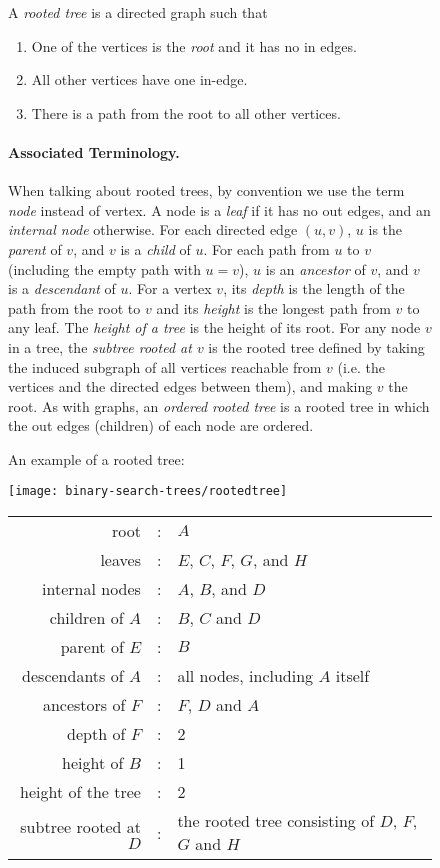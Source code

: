 \begin{figure}
\begin{definition}
\label{def:rootedtree}
A \emph{rooted tree} is a directed graph such that
\begin{enumerate}
\item 
One of the vertices is the \emph{root} and it has no in edges.
\item 
All other vertices have one in-edge.
\item
There is a path from the root to all other vertices.
\end{enumerate}
\paragraph{Associated Terminology.} \rm
When talking about rooted trees, by convention we use the term
\emph{node} instead of vertex.  A node is a \emph{leaf} if it has no
out edges, and an \emph{internal node} otherwise.  For each directed
edge $(u,v)$, $u$ is the \emph{parent} of $v$, and $v$ is a
\emph{child} of $u$.  For each path from $u$ to $v$ (including the
empty path with $u = v$), $u$ is an \emph{ancestor} of $v$, and $v$ is
a \emph{descendant} of $u$.  For a vertex $v$, its \emph{depth} is the
length of the path from the root to $v$ and its \emph{height} is the
longest path from $v$ to any leaf.  The \emph{height of a tree} is the
height of its root.  For any node $v$ in a tree, the \emph{subtree
  rooted at $v$} is the rooted tree defined by taking the induced
subgraph of all vertices reachable from $v$ (i.e. the vertices and the
directed edges between them), and making $v$ the root.  As with
graphs, an \emph{ordered rooted tree} is a rooted tree in which the
out edges (children) of each node are ordered.
\end{definition}

\begin{example}
\label{ex:rootedtree}
An example of a rooted tree:
\begin{center}
  \texttt{[image: binary-search-trees/rootedtree]}
\end{center}
\begin{center}
\begin{tabular}{rcl}
root & : & $A$\\
leaves & : & $E$, $C$, $F$, $G$, and $H$\\
internal nodes & : & $A$, $B$, and $D$\\
children of $A$ & : & $B$, $C$ and $D$\\
parent of $E$ & : & $B$\\
descendants of $A$ & : & all nodes, including $A$ itself\\
ancestors of $F$ & : & $F$, $D$ and $A$\\
depth of $F$ & : & 2\\
height of $B$ & : & 1\\
height of the tree & : & 2\\
subtree rooted at $D$ & : & the rooted tree consisting of $D$, $F$, $G$ and $H$
\end{tabular}
\end{center}
\end{example}
\end{figure}

